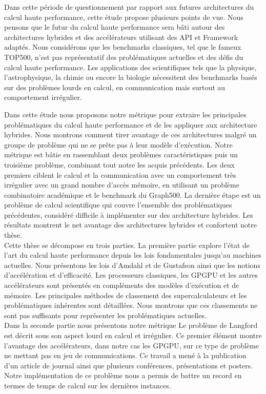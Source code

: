 \documentclass[12pt,a4paper]{report}
\begin{document}
Dans cette période de questionnement par rapport aux futures architectures du calcul haute performance, cette étude propose plusieurs points de vue. 
Nous pensons que le futur du calcul haute performance sera bâti autour des architectures hybrides et des accélérateurs utilisant des API et Framework adaptés. 
Nous considérons que les benchmarks classiques, tel que le fameux TOP500, n'est pas représentatif des problématiques actuelles et des défis du calcul haute performance.
Les applications des scientifiques tels que la physique, l'astrophysique, la chimie ou encore la biologie nécessitent des benchmarks basés sur des problèmes lourds en calcul, en communication mais surtout au comportement irrégulier.

Dans cette étude nous proposons notre métrique pour extraire les principales problématiques du calcul haute performance et de les appliquer aux architecture hybrides. 
Nous montrons comment tirer avantage de ces architectures malgré un groupe de problème qui ne se prête pas à leur modèle d'exécution.
Notre métrique est bâtie en rassemblant deux problèmes caractéristiques puis un troisième problème, combinant tout notre les acquis précédents. 
Les deux premiers ciblent le calcul et la communication avec un comportement très irrégulier avec un grand nombre d'accès mémoire, en utilisant un problème combinatoire académique et le benchmark du Graph500.
La dernière étape est un problème de calcul scientifique qui couvre l'ensemble des problématiques précédentes, considéré difficile à implémenter sur des architecture hybrides. 
Les résultats montrent le net avantage des architectures hybrides et confortent notre thèse. \\

Cette thèse se décompose en trois parties.
La première partie explore l'état de l'art du calcul haute performance depuis les lois fondamentales jusqu'au machines actuelles. 
Nous présentons les lois d'Amdahl et de Gustafson ainsi que les notions d'accélération et d'efficacité.  
Les processeurs classiques, les GPGPU et les autres accélérateurs sont présentés en compléments des modèles d'exécution et de mémoire. 
Les principales méthodes de classement des supercalculateurs et les problématiques inhérentes sont détaillées.
Nous montrons que ces classements ne sont pas suffisants pour représenter les problématiques actuelles.\\

Dans la seconde partie nous présentons notre métrique 
Le problème de Langford est décrit sous son aspect lourd en calcul et irrégulier. 
Ce premier élément montre l'avantage des accélérateurs, dans notre cas les GPGPU, sur ce type de problème ne mettant pas en jeu de communications.
Ce travail a mené à la publication d'un article de journal\cite{krajecki2016many} ainsi que plusieurs conférences, présentations et posters\cite{deleau2014towards,j2016resolution,jaillet2014Langford}.
Notre implémentation de ce problème nous a permis de battre un record en termes de temps de calcul sur les dernières instances.
\end{document}
